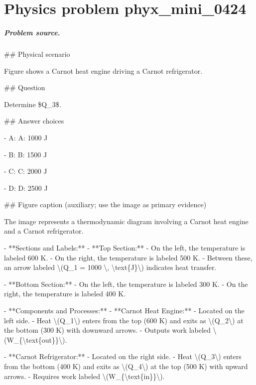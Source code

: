 
\chapter{Physics problem phyx\_mini\_0424}
\label{ch:PhyXMiniProblems_problem_phyx_mini_0424}

\paragraph{Problem source.}
\#\# Physical scenario

Figure shows a Carnot heat engine driving a Carnot refrigerator.

\#\# Question

Determine \$Q\_3\$.

\#\# Answer choices

- A: A: 1000 J

- B: B: 1500 J

- C: C: 2000 J

- D: D: 2500 J

\#\# Figure caption (auxiliary; use the image as primary evidence)

The image represents a thermodynamic diagram involving a Carnot heat engine and a Carnot refrigerator.

- **Sections and Labels:**
  - **Top Section:** 
    - On the left, the temperature is labeled 600 K.
    - On the right, the temperature is labeled 500 K.
    - Between these, an arrow labeled \textbackslash{}(Q\_1 = 1000 \textbackslash{}, \textbackslash{}text\{J\}\textbackslash{}) indicates heat transfer.

  - **Bottom Section:**
    - On the left, the temperature is labeled 300 K.
    - On the right, the temperature is labeled 400 K.

- **Components and Processes:**
  - **Carnot Heat Engine:**
    - Located on the left side.
    - Heat \textbackslash{}(Q\_1\textbackslash{}) enters from the top (600 K) and exits as \textbackslash{}(Q\_2\textbackslash{}) at the bottom (300 K) with downward arrows.
    - Outputs work labeled \textbackslash{}(W\_\{\textbackslash{}text\{out\}\}\textbackslash{}).

  - **Carnot Refrigerator:**
    - Located on the right side.
    - Heat \textbackslash{}(Q\_3\textbackslash{}) enters from the bottom (400 K) and exits as \textbackslash{}(Q\_4\textbackslash{}) at the top (500 K) with upward arrows.
    - Requires work labeled \textbackslash{}(W\_\{\textbackslash{}text\{in\}\}\textbackslash{}).

